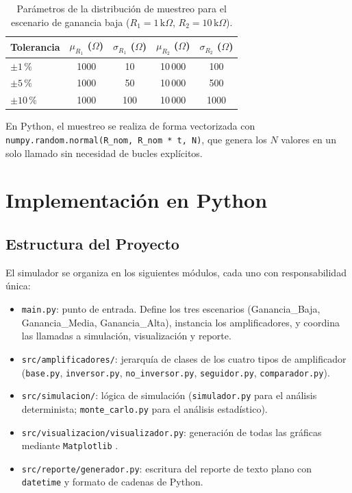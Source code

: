 ﻿\documentclass[12pt, letterpaper]{article}
\begin{document}
\begin{table}[h]
    \centering
    \caption{Parámetros de la distribución de muestreo para el escenario de
             ganancia baja (\(R_1 = 1\,\text{k}\Omega\),
             \(R_2 = 10\,\text{k}\Omega\)).}%
    \label{tab:muestreo}
    \begin{tabular}{lcccc}
        \toprule
        Tolerancia & \(\mu_{R_1}\) (\(\Omega\)) & \(\sigma_{R_1}\) (\(\Omega\))
                   & \(\mu_{R_2}\) (\(\Omega\)) & \(\sigma_{R_2}\) (\(\Omega\)) \\
        \midrule
        \(\pm 1\,\text{\%}\)  & 1000 & 10  & 10\,000 & 100  \\
        \(\pm 5\,\text{\%}\)  & 1000 & 50  & 10\,000 & 500  \\
        \(\pm 10\,\text{\%}\) & 1000 & 100 & 10\,000 & 1000 \\
        \bottomrule
    \end{tabular}
\end{table}

En Python, el muestreo se realiza de forma vectorizada con
\texttt{numpy.random.normal(R\_nom,\; R\_nom * t,\; N)}, que genera los \(N\)
valores en un solo llamado sin necesidad de bucles explícitos.

\section{Implementación en Python}

\subsection{Estructura del Proyecto}

El simulador se organiza en los siguientes módulos, cada uno con
responsabilidad única:

\begin{itemize}[leftmargin=2em]
    \item \texttt{main.py}: punto de entrada. Define los tres escenarios
          (Ganancia\_Baja, Ganancia\_Media, Ganancia\_Alta), instancia los
          amplificadores, y coordina las llamadas a simulación, visualización
          y reporte.
    \item \texttt{src/amplificadores/}: jerarquía de clases de los cuatro
          tipos de amplificador (\texttt{base.py}, \texttt{inversor.py},
          \texttt{no\_inversor.py}, \texttt{seguidor.py},
          \texttt{comparador.py}).
    \item \texttt{src/simulacion/}: lógica de simulación
          (\texttt{simulador.py} para el análisis determinista;
          \texttt{monte\_carlo.py} para el análisis estadístico).
    \item \texttt{src/visualizacion/visualizador.py}: generación de todas
          las gráficas mediante \texttt{Matplotlib} \cite{hunter2007}.
    \item \texttt{src/reporte/generador.py}: escritura del reporte de texto
          plano con \texttt{datetime} y formato de cadenas de Python.
\end{itemize}
\end{document}
